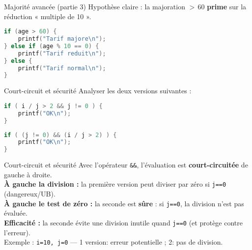 \begin{UPSTIprofOnlyEnv}
  \begin{UPSTIcorrectionP}{Majorité avancée (partie 3)}
    Hypothèse claire : la majoration $>$\,$60$ \textbf{prime} sur la réduction « multiple de 10 ».
\begin{lstlisting}[language=C]
if (age > 60) {
    printf("Tarif majore\n");
} else if (age % 10 == 0) {
    printf("Tarif reduit\n");
} else {
    printf("Tarif normal\n");
}
\end{lstlisting}
  \end{UPSTIcorrectionP}
\end{UPSTIprofOnlyEnv}

\begin{UPSTIexercice}{Court-circuit et sécurité}
Analyser les deux versions suivantes :\\
\begin{minipage}{.49\linewidth}
\begin{lstlisting}[language=C]
if ( i / j > 2 && j != 0 ) {
    printf("OK\n");
}
\end{lstlisting}
\end{minipage}
\begin{minipage}{.49\linewidth}
\begin{lstlisting}[language=C]
if ( (j != 0) && (i / j > 2) ) {
    printf("OK\n");
}
\end{lstlisting}
\end{minipage}
\end{UPSTIexercice}

\begin{UPSTIprofOnlyEnv}
  \begin{UPSTIcorrectionP}{Court-circuit et sécurité}
    Avec l’opérateur \texttt{\&\&}, l’évaluation est \textbf{court-circuitée} de gauche à droite.  \\
    \textbf{À gauche la division :} la première version peut diviser par zéro si \texttt{j==0} (dangereux/UB).  \\
    \textbf{À gauche le test de zéro :} la seconde est \textbf{sûre} : si \texttt{j==0}, la division n’est pas évaluée. \\ 
    \textbf{Efficacité :} la seconde évite une division inutile quand \texttt{j==0} (et protège contre l’erreur). \\Exemple : \texttt{i=10, j=0} — 1\iere{} version: erreur potentielle ; 2\ieme{}: pas de division.
  \end{UPSTIcorrectionP}
\end{UPSTIprofOnlyEnv}
